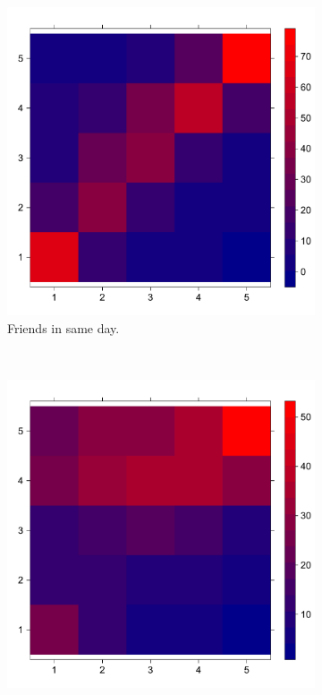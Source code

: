 \begin{figure}[H]
  \centering
  \begin{subfigure}[b]{0.5\textwidth}
    \captionsetup{font=small}
    \includegraphics[width=\textwidth]{img/amig_eq_n}
    \caption{Friends in same day.}\label{fig:fri_eq}
  \end{subfigure}%
  ~
  \begin{subfigure}[b]{0.5\textwidth}
    \captionsetup{font=small}
    \includegraphics[width=\textwidth]{img/namig_eq_n}

\end{subfigure}
\end{figure}
